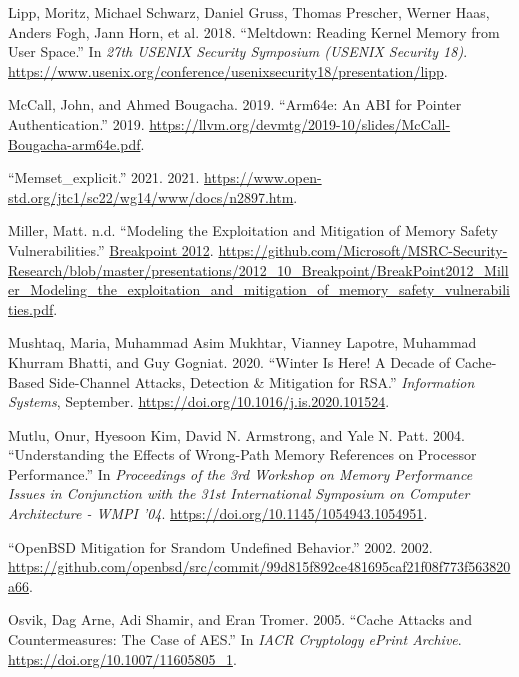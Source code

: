\documentclass[
  a4paper,
]{report}
\newlength{\cslhangindent}
\newlength{\cslentryspacingunit} %
\newenvironment{CSLReferences}[2] %
 {%
  \setlength{\parindent}{0pt}
  \ifodd #1
  \let\oldpar\par
  \def\par{\hangindent=\cslhangindent\oldpar}
  \fi
  \setlength{\parskip}{#2\cslentryspacingunit}
 }%
 {}
\begin{document}
\begin{CSLReferences}{1}{0}
\leavevmode{}%
Lipp, Moritz, Michael Schwarz, Daniel Gruss, Thomas Prescher, Werner
Haas, Anders Fogh, Jann Horn, et al. 2018. {``Meltdown: Reading Kernel
Memory from User Space.''} In \emph{27th USENIX Security Symposium
(USENIX Security 18)}.
\url{https://www.usenix.org/conference/usenixsecurity18/presentation/lipp}.

\leavevmode{}%
McCall, John, and Ahmed Bougacha. 2019. {``Arm64e: An ABI for Pointer
Authentication.''} 2019.
\url{https://llvm.org/devmtg/2019-10/slides/McCall-Bougacha-arm64e.pdf}.

\leavevmode{}%
{``Memset\_explicit.''} 2021. 2021.
\url{https://www.open-std.org/jtc1/sc22/wg14/www/docs/n2897.htm}.

\leavevmode{}%
Miller, Matt. n.d. {``Modeling the Exploitation and Mitigation of Memory
Safety Vulnerabilities.''}
\href{https://2012.ruxconbreakpoint.com/}{Breakpoint 2012}.
\url{https://github.com/Microsoft/MSRC-Security-Research/blob/master/presentations/2012_10_Breakpoint/BreakPoint2012_Miller_Modeling_the_exploitation_and_mitigation_of_memory_safety_vulnerabilities.pdf}.

\leavevmode{}%
Mushtaq, Maria, Muhammad Asim Mukhtar, Vianney Lapotre, Muhammad Khurram
Bhatti, and Guy Gogniat. 2020. {``Winter Is Here! A Decade of
Cache-Based Side-Channel Attacks, Detection \& Mitigation for {RSA}.''}
\emph{Information Systems}, September.
\url{https://doi.org/10.1016/j.is.2020.101524}.

\leavevmode{}%
Mutlu, Onur, Hyesoon Kim, David N. Armstrong, and Yale N. Patt. 2004.
{``Understanding the Effects of Wrong-Path Memory References on
Processor Performance.''} In \emph{Proceedings of the 3rd Workshop on
Memory Performance Issues in Conjunction with the 31st International
Symposium on Computer Architecture - WMPI '04}.
\url{https://doi.org/10.1145/1054943.1054951}.

\leavevmode{}%
{``OpenBSD Mitigation for Srandom Undefined Behavior.''} 2002. 2002.
\url{https://github.com/openbsd/src/commit/99d815f892ce481695caf21f08f773f563820a66}.

\leavevmode{}%
Osvik, Dag Arne, Adi Shamir, and Eran Tromer. 2005. {``Cache Attacks and
Countermeasures: The Case of AES.''} In \emph{IACR Cryptology ePrint
Archive}. \url{https://doi.org/10.1007/11605805_1}.


\end{CSLReferences}
\end{document}
